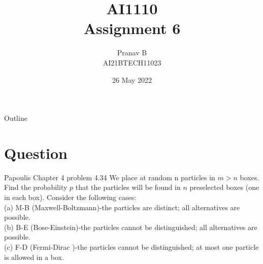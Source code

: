 \documentclass{beamer}
\title{AI1110 \\ Assignment 6}
\author{Pranav B \\ AI21BTECH11023}
\date{26 May 2022}
\begin{document}
	\begin{frame}
		\titlepage
	\end{frame}
	
	\begin{frame}{Outline}
    		\tableofcontents
	\end{frame}
	
	\section{Question}
	\begin{frame}{ Papoulis Chapter 4 problem 4.34}
	We place at random n particles in $m > n$ boxes. Find the probability $p$ that the particles will be found in $n$ preselected boxes (one in each box). Consider the following cases:\\
(a) M-B (Maxwell-Boltzmann)-the particles are distinct; all alternatives are possible.\\
(b) B-E (Bose-Einstein)-the particles cannot be distinguished; all alternatives are possible.\\
(c) F-D (Fermi-Dirac )-the particles cannot be distinguished; at most one particle is allowed in a box.\\
	\end{frame}
\end{document}
